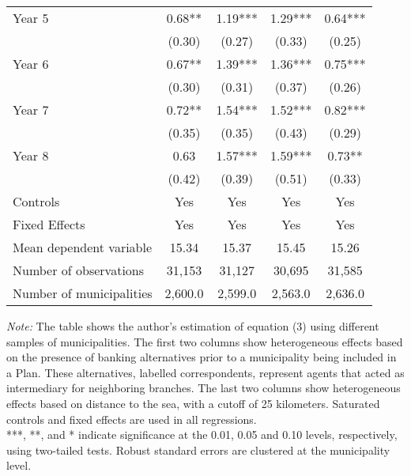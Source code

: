 \begin{table}[H]
\begin{threeparttable}
\begin{tabular}[t]{lcccc}
Year 5 & 0.68** & 1.19*** & 1.29*** & 0.64***\\
 & (0.30) & (0.27) & (0.33) & (0.25)\\
Year 6 & 0.67** & 1.39*** & 1.36*** & 0.75***\\
 & (0.30) & (0.31) & (0.37) & (0.26)\\
Year 7 & 0.72** & 1.54*** & 1.52*** & 0.82***\\
 & (0.35) & (0.35) & (0.43) & (0.29)\\
Year 8 & 0.63 & 1.57*** & 1.59*** & 0.73**\\
 & (0.42) & (0.39) & (0.51) & (0.33)\\
\midrule
Controls & Yes & Yes & Yes & Yes\\
Fixed Effects & Yes & Yes & Yes & Yes\\
\midrule
Mean dependent variable & 15.34 & 15.37 & 15.45 & 15.26\\
Number of observations & 31,153 & 31,127 & 30,695 & 31,585\\
Number of municipalities & 2,600.0 & 2,599.0 & 2,563.0 & 2,636.0\\
\bottomrule
\end{tabular}
\begin{tablenotes}[para]
\item \footnotesize \textit{Note:} The table shows the author's estimation of equation (3) using different samples of municipalities. The first two
      columns show heterogeneous effects based on the presence of banking alternatives prior to a municipality being included in a Plan. These alternatives,
      labelled correspondents, represent agents that acted as intermediary for neighboring branches. The last two columns show heterogeneous effects based on 
      distance to the sea, with a cutoff of 25 kilometers. Saturated controls and fixed effects are used in all regressions. \\
      ***, **, and *
      indicate significance at the 0.01, 0.05 and 0.10 levels, respectively, using two-tailed tests. Robust standard errors are clustered
      at the municipality level.
\end{tablenotes}
\end{threeparttable}
\end{table}
